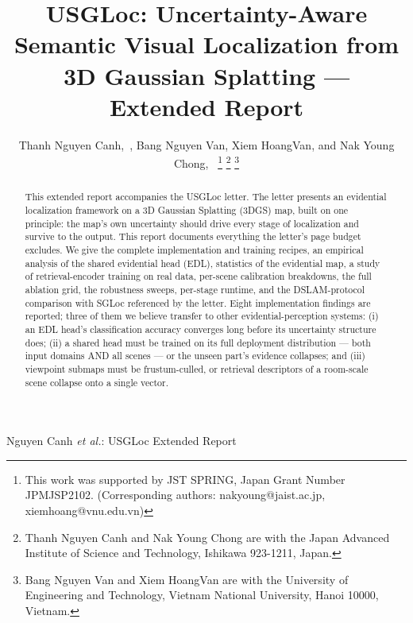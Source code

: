 \documentclass[journal]{IEEEtran}
\newcommand{\method}{USGLoc}
\begin{document}
\title{\method{}: Uncertainty-Aware Semantic Visual Localization from
3D Gaussian Splatting --- Extended Report}

\author{Thanh Nguyen Canh,~,
Bang Nguyen Van, Xiem HoangVan, and Nak Young Chong,~
\thanks{This work was supported by JST SPRING, Japan Grant Number JPMJSP2102.
(Corresponding authors: nakyoung@jaist.ac.jp, xiemhoang@vnu.edu.vn)}
\thanks{Thanh Nguyen Canh and Nak Young Chong are with the Japan Advanced
Institute of Science and Technology, Ishikawa 923-1211, Japan.}
\thanks{Bang Nguyen Van and Xiem HoangVan are with the University of
Engineering and Technology, Vietnam National University, Hanoi 10000, Vietnam.}}

%
{Nguyen Canh \MakeLowercase{\textit{et al.}}: \method{} Extended Report}

\maketitle

\begin{abstract}
This extended report accompanies the \method{} letter. The letter presents an
evidential localization framework on a 3D Gaussian Splatting (3DGS) map,
built on one principle: the map's own uncertainty should drive every stage of
localization and survive to the output. This report documents everything the
letter's page budget excludes. We give the complete implementation and
training recipes, an empirical analysis of the shared evidential head (EDL),
statistics of the evidential map, a study of retrieval-encoder training on
real data, per-scene calibration breakdowns, the full ablation grid, the
robustness sweeps, per-stage runtime, and the DSLAM-protocol comparison with
SGLoc referenced by the letter. Eight implementation findings are reported; three of them we believe transfer to other evidential-perception systems:
(i) an EDL head's classification accuracy converges long before its
uncertainty structure does; (ii) a shared head must be trained on its full
deployment distribution --- both input domains AND all scenes --- or the
unseen part's evidence collapses; and (iii) viewpoint submaps must be
frustum-culled, or retrieval descriptors of a room-scale scene collapse onto
a single vector.
\end{abstract}
\end{document}
